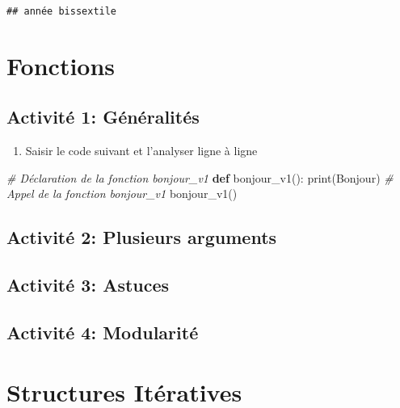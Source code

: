 \documentclass[
]{book}
\newenvironment{Shaded}{\begin{snugshade}}{\end{snugshade}}
\newcommand{\BuiltInTok}[1]{#1}
\newcommand{\CommentTok}[1]{\textcolor[rgb]{0.56,0.35,0.01}{\textit{#1}}}
\newcommand{\KeywordTok}[1]{\textcolor[rgb]{0.13,0.29,0.53}{\textbf{#1}}}
\newcommand{\NormalTok}[1]{#1}
\newcommand{\StringTok}[1]{\textcolor[rgb]{0.31,0.60,0.02}{#1}}
\providecommand{\tightlist}{%
  \setlength{\itemsep}{0pt}\setlength{\parskip}{0pt}}
\def\tightlist{}
\begin{document}
\begin{verbatim}
## année bissextile
\end{verbatim}

\hypertarget{fonctions}{%
\chapter{Fonctions}\label{fonctions}}

\hypertarget{activituxe9-1-guxe9nuxe9ralituxe9s}{%
\section{Activité 1: Généralités}\label{activituxe9-1-guxe9nuxe9ralituxe9s}}

\begin{enumerate}
\def\labelenumi{\arabic{enumi}.}
\tightlist
\item
  Saisir le code suivant et l'analyser ligne à ligne
\end{enumerate}

\begin{Shaded}
\begin{Highlighting}[]
\CommentTok{\# Déclaration de la fonction bonjour\_v1}
\KeywordTok{def}\NormalTok{ bonjour\_v1():}
    \BuiltInTok{print}\NormalTok{(}\StringTok{\textquotesingle{}Bonjour\textquotesingle{}}\NormalTok{)}
\CommentTok{\# Appel de la fonction bonjour\_v1}
\NormalTok{bonjour\_v1()}
\end{Highlighting}
\end{Shaded}

\hypertarget{activituxe9-2-plusieurs-arguments}{%
\section{Activité 2: Plusieurs arguments}\label{activituxe9-2-plusieurs-arguments}}

\hypertarget{activituxe9-3-astuces}{%
\section{Activité 3: Astuces}\label{activituxe9-3-astuces}}

\hypertarget{activituxe9-4-modularituxe9}{%
\section{Activité 4: Modularité}\label{activituxe9-4-modularituxe9}}

\hypertarget{structures-ituxe9ratives}{%
\chapter{Structures Itératives}\label{structures-ituxe9ratives}}
\end{document}
